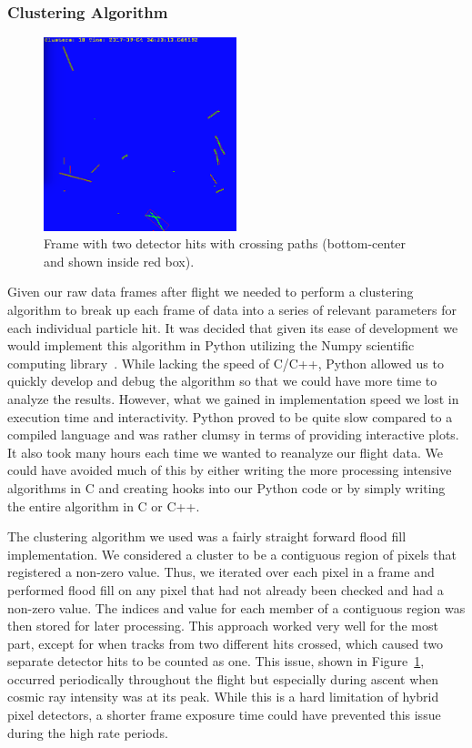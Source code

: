 {\subsubsection{Clustering Algorithm}  	
\begin{figure}
 	\begin{center}
 	\includegraphics[width=0.5\textwidth]{./Figures/crossedtracks.png}
 	\caption{Frame with two detector hits with crossing paths (bottom-center and shown inside red box).}
 	\label{fig:crossedtracks}
 	\end{center}
\end{figure}

  	Given our raw data frames after flight we needed to perform a clustering algorithm to break up each frame of data into a series of relevant parameters for each individual particle hit. It was decided that given its ease of development we would implement this algorithm in Python utilizing the Numpy scientific computing library~\cite{numpy}. While lacking the speed of C/C++, Python allowed us to quickly develop and debug the algorithm so that we could have more time to analyze the results. However, what we gained in implementation speed we lost in execution time and interactivity. Python proved to be quite slow compared to a compiled language and was rather clumsy in terms of providing interactive plots. It also took many hours each time we wanted to reanalyze our flight data. We could have avoided much of this by either writing the more processing intensive algorithms in C and creating hooks into our Python code or by simply writing the entire algorithm in C or C++.

The clustering algorithm we used was a fairly straight forward flood fill implementation. We considered a cluster to be a contiguous region of pixels that registered a non-zero value. Thus, we iterated over each pixel in a frame and performed flood fill on any pixel that had not already been checked and had a non-zero value. The indices and value for each member of a contiguous region was then stored for later processing. This approach worked very well for the most part, except for when tracks from two different hits crossed, which caused two separate detector hits to be counted as one. This issue, shown in Figure~\ref{fig:crossedtracks}, occurred periodically throughout the flight but especially during ascent when cosmic ray intensity was at its peak. While this is a hard limitation of hybrid pixel detectors, a shorter frame exposure time could have prevented this issue during the high rate periods.



}
